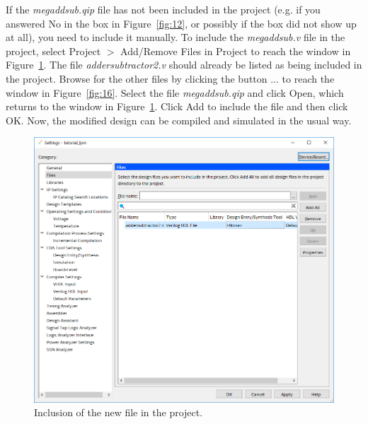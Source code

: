 \documentclass[11pt, twoside, pdftex]{article}
\begin{document}
If the {\it megaddsub.qip} file has not been included in the project (e.g. if you
answered {\sf No} in the box in Figure~\ref{fig:12}, or possibly if the box did not show up at all),
you need to include it manually. To include the {\it megaddsub.v} file in the project,
select {\sf Project $>$ Add/Remove Files in Project} to reach the window in Figure~\ref{fig:15}.
The file {\it addersubtractor2.v} should already be listed as being included 
in the project. Browse for the other files by clicking the button
{\sf ...} to reach the window in Figure~\ref{fig:16}.
Select the file {\it megaddsub.qip} and click {\sf Open}, which returns to the
window in Figure~\ref{fig:15}. Click {\sf Add} to include the file and then click {\sf OK}.
Now, the modified design can be compiled and simulated in the usual way.

\begin{figure}[H]
   \begin{center}
      \includegraphics[scale=0.4]{figures/figure15.png}
   \caption{Inclusion of the new file in the project.} 
	 \label{fig:15}
	 \end{center}
\end{figure}
 
\end{document}
